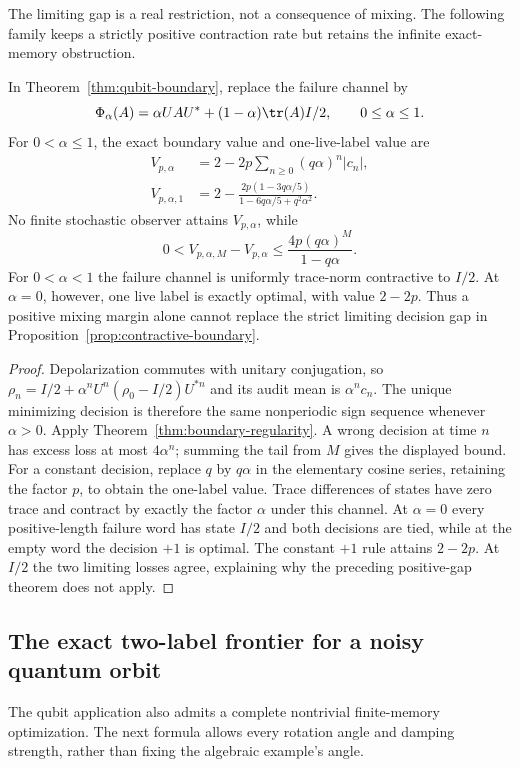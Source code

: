 The limiting gap is a real restriction, not a consequence of mixing. The following family keeps a strictly positive contraction rate but retains the infinite exact-memory obstruction.
\begin{corollary}\label{cor:noisy-boundary}
In Theorem~\ref{thm:qubit-boundary}, replace the failure channel by
\[
 \Phi_\alpha(A)=\alpha UAU^*+(1-\alpha)\tr(A)I/2,
                    \qquad 0\le\alpha\le1.
\]
For $0<\alpha\le1$, the exact boundary value and one-live-label value are
\begin{align*}
 V_{p,\alpha}&=2-2p\sum_{n\ge0}(q\alpha)^n|c_n|,\\
 V_{p,\alpha,1}&=2-\frac{2p(1-3q\alpha/5)}{1-6q\alpha/5+q^2\alpha^2}.
\end{align*}
No finite stochastic observer attains $V_{p,\alpha}$, while
\[
 0<V_{p,\alpha,M}-V_{p,\alpha}
       \le \frac{4p(q\alpha)^M}{1-q\alpha}.
\]
For $0<\alpha<1$ the failure channel is uniformly trace-norm contractive to $I/2$. At $\alpha=0$, however, one live label is exactly optimal, with value $2-2p$. Thus a positive mixing margin alone cannot replace the strict limiting decision gap in Proposition~\ref{prop:contractive-boundary}.
\end{corollary}
\begin{proof}
Depolarization commutes with unitary conjugation, so
$\rho_n=I/2+\alpha^n U^n(\rho_0-I/2)U^{*n}$ and its audit mean is $\alpha^nc_n$. The unique minimizing decision is therefore the same nonperiodic sign sequence whenever $\alpha>0$. Apply Theorem~\ref{thm:boundary-regularity}. A wrong decision at time $n$ has excess loss at most $4\alpha^n$; summing the tail from $M$ gives the displayed bound. For a constant decision, replace $q$ by $q\alpha$ in the elementary cosine series, retaining the factor $p$, to obtain the one-label value. Trace differences of states have zero trace and contract by exactly the factor $\alpha$ under this channel. At $\alpha=0$ every positive-length failure word has state $I/2$ and both decisions are tied, while at the empty word the decision $+1$ is optimal. The constant $+1$ rule attains $2-2p$. At $I/2$ the two limiting losses agree, explaining why the preceding positive-gap theorem does not apply.
\end{proof}

\subsection{The exact two-label frontier for a noisy quantum orbit}
The qubit application also admits a complete nontrivial finite-memory optimization. The next formula allows every rotation angle and damping strength, rather than fixing the algebraic example's angle.

